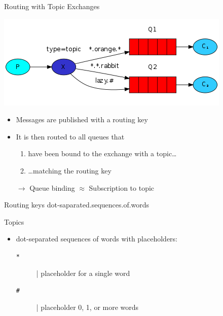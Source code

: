 \documentclass{beamer}\mode<presentation>{\usetheme{AMSBolognaFC}}
\begin{document}
\begin{frame}[allowframebreaks]{Routing with Topic Exchanges}

    \begin{center}
        \includegraphics[width=.5\linewidth]{img/routing.png}
    \end{center}

    \bigskip

    \begin{itemize}
        \item Messages are published with a \alert{routing key}

        \medskip

        \item It is then routed to all queues that
        \begin{enumerate}
            \item have been bound to the exchange with a \alert{topic}\ldots
            \item \ldots \alert{matching} the routing key
        \end{enumerate}

        \bigskip

        \item[$\rightarrow$] Queue binding $\approx$ Subscription to topic
    \end{itemize}

    \framebreak

    \begin{block}{Routing keys}\ttfamily\centering
        dot-saparated.sequences.of.words
    \end{block}

    \bigskip

    \begin{block}{Topics}
        \begin{itemize}
            \item dot-separated sequences of words with placeholders:
            \begin{description}
                \item[\texttt{*}] | placeholder for a single word
                \item[\texttt{\#}] | placeholder 0, 1, or more words
            \end{description}
        \end{itemize}
    \end{block}

\end{frame}
\end{document}
